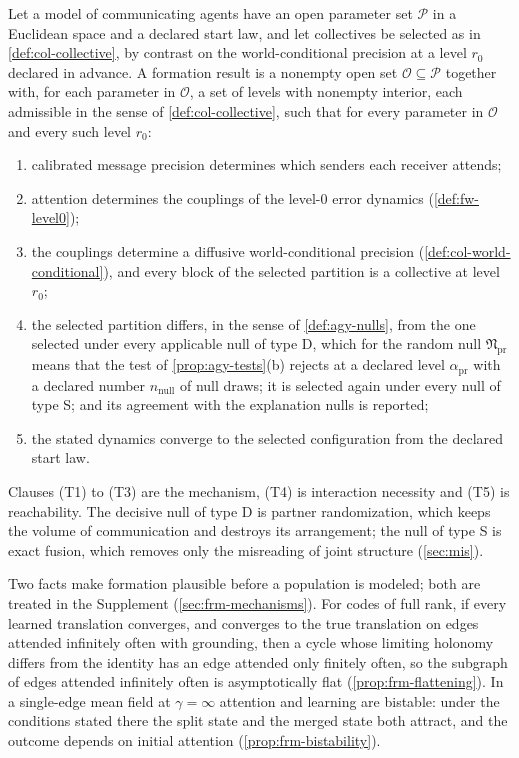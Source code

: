 \begin{definition}\label{def:frm-target}
Let a model of communicating agents have an open parameter set $\mathcal P$ in a Euclidean space and a declared start law, and let collectives be selected as in \cref{def:col-collective}, by contrast on the world-conditional precision at a level $r_0$ declared in advance. A formation result is a nonempty open set $\mathcal O\subseteq\mathcal P$ together with, for each parameter in $\mathcal O$, a set of levels with nonempty interior, each admissible in the sense of \cref{def:col-collective}, such that for every parameter in $\mathcal O$ and every such level $r_0$:
\begin{enumerate}
\item[(T1)] calibrated message precision determines which senders each receiver attends;
\item[(T2)] attention determines the couplings of the level-0 error dynamics (\cref{def:fw-level0});
\item[(T3)] the couplings determine a diffusive world-conditional precision (\cref{def:col-world-conditional}), and every block of the selected partition is a collective at level $r_0$;
\item[(T4)] the selected partition differs, in the sense of \cref{def:agy-nulls}, from the one selected under every applicable null of type D, which for the random null $\mathfrak N_{\mathrm{pr}}$ means that the test of \cref{prop:agy-tests}(b) rejects at a declared level $\alpha_{\mathrm{pr}}$ with a declared number $n_{\mathrm{null}}$ of null draws; it is selected again under every null of type S; and its agreement with the explanation nulls is reported;
\item[(T5)] the stated dynamics converge to the selected configuration from the declared start law.
\end{enumerate}
\end{definition}

Clauses (T1) to (T3) are the mechanism, (T4) is interaction necessity and (T5) is reachability. The decisive null of type D is partner randomization, which keeps the volume of communication and destroys its arrangement; the null of type S is exact fusion, which removes only the misreading of joint structure (\cref{sec:mis}).

Two facts make formation plausible before a population is modeled; both are treated in the Supplement (\cref{sec:frm-mechanisms}). For codes of full rank, if every learned translation converges, and converges to the true translation on edges attended infinitely often with grounding, then a cycle whose limiting holonomy differs from the identity has an edge attended only finitely often, so the subgraph of edges attended infinitely often is asymptotically flat (\cref{prop:frm-flattening}). In a single-edge mean field at $\gamma=\infty$ attention and learning are bistable: under the conditions stated there the split state and the merged state both attract, and the outcome depends on initial attention (\cref{prop:frm-bistability}).

